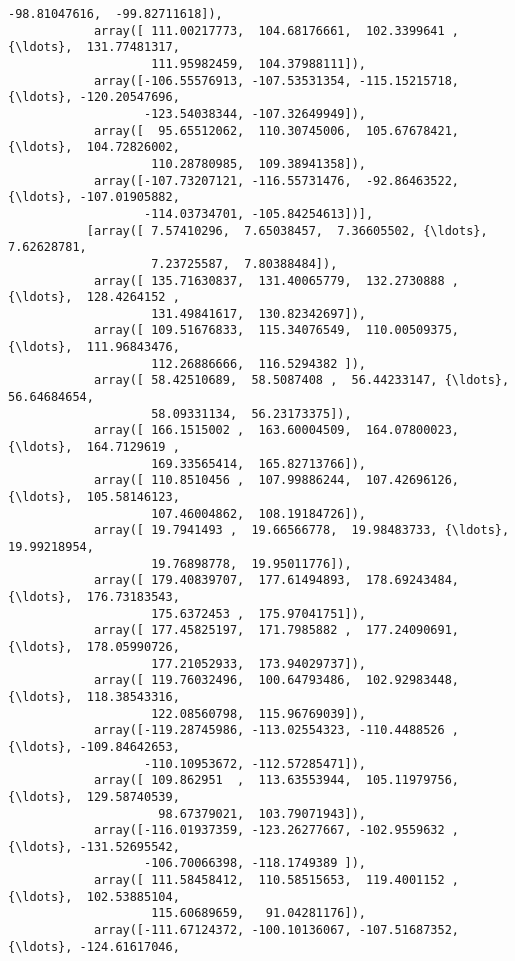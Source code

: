 \documentclass[11pt]{article}
\begin{document}
\begin{Verbatim}[commandchars=\\\{\}]
                    -98.81047616,  -99.82711618]),
            array([ 111.00217773,  104.68176661,  102.3399641 , {\ldots},  131.77481317,
                    111.95982459,  104.37988111]),
            array([-106.55576913, -107.53531354, -115.15215718, {\ldots}, -120.20547696,
                   -123.54038344, -107.32649949]),
            array([  95.65512062,  110.30745006,  105.67678421, {\ldots},  104.72826002,
                    110.28780985,  109.38941358]),
            array([-107.73207121, -116.55731476,  -92.86463522, {\ldots}, -107.01905882,
                   -114.03734701, -105.84254613])],
           [array([ 7.57410296,  7.65038457,  7.36605502, {\ldots},  7.62628781,
                    7.23725587,  7.80388484]),
            array([ 135.71630837,  131.40065779,  132.2730888 , {\ldots},  128.4264152 ,
                    131.49841617,  130.82342697]),
            array([ 109.51676833,  115.34076549,  110.00509375, {\ldots},  111.96843476,
                    112.26886666,  116.5294382 ]),
            array([ 58.42510689,  58.5087408 ,  56.44233147, {\ldots},  56.64684654,
                    58.09331134,  56.23173375]),
            array([ 166.1515002 ,  163.60004509,  164.07800023, {\ldots},  164.7129619 ,
                    169.33565414,  165.82713766]),
            array([ 110.8510456 ,  107.99886244,  107.42696126, {\ldots},  105.58146123,
                    107.46004862,  108.19184726]),
            array([ 19.7941493 ,  19.66566778,  19.98483733, {\ldots},  19.99218954,
                    19.76898778,  19.95011776]),
            array([ 179.40839707,  177.61494893,  178.69243484, {\ldots},  176.73183543,
                    175.6372453 ,  175.97041751]),
            array([ 177.45825197,  171.7985882 ,  177.24090691, {\ldots},  178.05990726,
                    177.21052933,  173.94029737]),
            array([ 119.76032496,  100.64793486,  102.92983448, {\ldots},  118.38543316,
                    122.08560798,  115.96769039]),
            array([-119.28745986, -113.02554323, -110.4488526 , {\ldots}, -109.84642653,
                   -110.10953672, -112.57285471]),
            array([ 109.862951  ,  113.63553944,  105.11979756, {\ldots},  129.58740539,
                     98.67379021,  103.79071943]),
            array([-116.01937359, -123.26277667, -102.9559632 , {\ldots}, -131.52695542,
                   -106.70066398, -118.1749389 ]),
            array([ 111.58458412,  110.58515653,  119.4001152 , {\ldots},  102.53885104,
                    115.60689659,   91.04281176]),
            array([-111.67124372, -100.10136067, -107.51687352, {\ldots}, -124.61617046,

\end{Verbatim}
\end{document}
